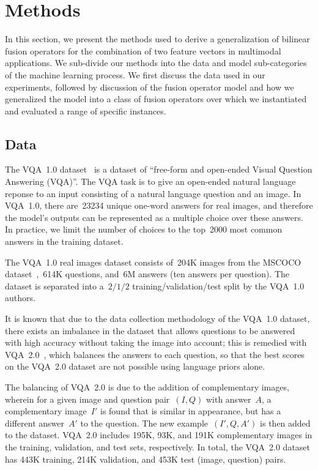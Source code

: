 \section{Methods}

In this section, we present the methods used to
derive a generalization of bilinear fusion operators for the combination of two
feature vectors in multimodal applications. We sub-divide our methods into the
data and model sub-categories of the machine learning process. We first discuss
the data used in our experiments, followed by discussion of the fusion operator
model and how we generalized the model into a class of fusion operators over
which we instantiated and evaluated a range of specific instances.


\subsection{Data}

The VQA~1.0 dataset~\citep{VQA} is a dataset of ``free-form and open-ended
Visual Question Answering (VQA)''. The VQA task is to give an open-ended
natural language reponse to an input consisting of a natural language question
and an image. In VQA~1.0, there are~\num{23234} unique one-word answers for
real images, and therefore the model's outputs can be represented as a multiple
choice over these answers. In practice, we limit the number of choices to the
top~\num{2000} most common answers in the training dataset.

The VQA~1.0 real images dataset consists of~\num{204}K images from the MSCOCO
dataset~\citep{lin2014microsoft},~\num{614}K questions, and~\num{6}M answers (ten
answers per question). The dataset is separated into a~$2/1/2$
training/validation/test split by the VQA~1.0 authors.

It is known that due to the data collection methodology of the VQA~1.0 dataset,
there exists an imbalance in the dataset that allows questions to be answered
with high accuracy without taking the image into
account; this is remedied with VQA~2.0~\citep{goyal2017making}, which balances the answers to each
question, so that the best scores on the VQA~2.0 dataset are not possible using
language priors alone.

The balancing of VQA~2.0 is due to the addition of complementary images, wherein
for a given image and question pair~$(I, Q)$ with answer~$A$, a complementary
image~$I'$ is found that is similar in appearance, but has a different answer~$A'$ to the
question. The new example~$(I', Q, A')$ is then added to the dataset. VQA~2.0
includes 195K, 93K, and 191K complementary images in the training, validation, and test
sets, respectively. In total, the VQA~2.0 dataset has 443K training, 214K validation, and
453K test (image, question) pairs.

